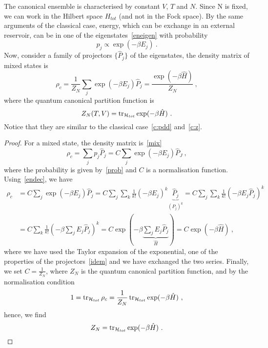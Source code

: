     The canonical ensemble is characterised by constant $V$, $T$ and $N$. Since N
    is fixed, we can work in the Hilbert space $H_{tot}$ (and not in the Fock space).
    By the same arguments of the classical case, energy, which can be exchange in an external reservoir, can be in one of the eigenstates~\eqref{eneigen} with probability 
    \begin{equation}\label{prob}
        p_j \propto \exp(- \beta E_j) ~.
    \end{equation}
    Now, consider a family of projectors $\{\hat P_j\}$ of the eigenstates, the density matrix of mixed states is 
    \begin{equation*}
        \rho_c = \frac{1}{Z_N } \sum_j \exp(- \beta E_j) \hat P_j = \frac{\exp(- \beta \hat H)}{Z_N} ~,
    \end{equation*}
    where the quantum canonical partition function is 
    \begin{equation*}
        Z_N(T,V) = \operatorname{tr}_{\mathcal H_{tot}} \exp(- \beta \hat H) ~.
    \end{equation*}
    Notice that they are similar to the classical case~\eqref{c:pdd} and~\eqref{c:z}.
    \begin{proof}
        For a mixed state, the density matrix is~\eqref{mix}
        \begin{equation*}
            \rho_c = \sum_j p_j \hat P_j = C \sum_j \exp(- \beta E_j) \hat P_J ~,
        \end{equation*}
        where the probability is given by~\eqref{prob} and $C$ is a normalisation function.
        Using~\eqref{endec}, we have
        \begin{equation*}
        \begin{aligned}
            \rho_c & = C \sum_j \exp(- \beta E_j) \hat P_j = C \sum_j \sum_k \frac{1}{k!} (-\beta E_j)^k \underbrace{\hat P_j}_{(P_j)^k} = C \sum_j \sum_k \frac{1}{k!} (-\beta E_j \hat P_j)^k \\ & = C \sum_k \frac{1}{k!} (-\beta \sum_j E_j \hat P_j)^k = C \exp(- \beta \underbrace{\sum_j E_j \hat P_j}_{\hat H}) = C \exp(- \beta \hat H) ~,
        \end{aligned}
        \end{equation*}
        where we have used the Taylor expansion of the exponential, one of the properties of the projectors~\eqref{idem} and we have exchanged the two series.
        Finally, we set $C = \frac{1}{Z_N}$, where $Z_N$ is the quantum canonical partition function, and by the normalisation condition
        \begin{equation*}
            1 = \operatorname{tr}_{\mathcal H_{tot}} \rho_c = \frac{1}{Z_N} \operatorname{tr}_{\mathcal H_{tot}} \exp(- \beta \hat H) ~,
        \end{equation*}
        hence, we find 
        \begin{equation*}
            Z_N = \operatorname{tr}_{\mathcal H_{tot}} \exp(- \beta \hat H) ~.
        \end{equation*}
    \end{proof}

